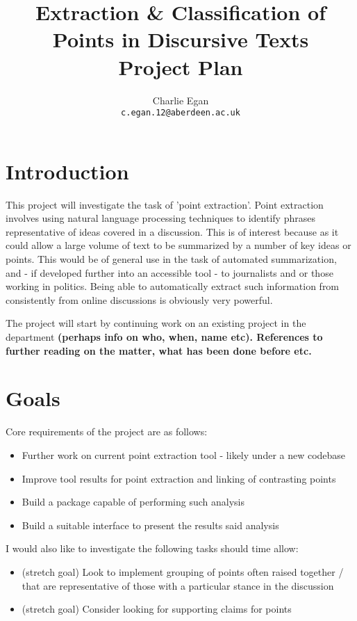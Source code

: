 \documentclass[tikz]{article}
\begin{document}
  \title{Extraction \& Classification of Points in Discursive Texts\\ Project Plan}
  \author{Charlie Egan \\ \texttt{c.egan.12@aberdeen.ac.uk}}

  \maketitle

  \section{Introduction}
    This project will investigate the task of 'point extraction'. Point extraction involves using natural language processing techniques to identify phrases representative of ideas covered in a discussion. This is of interest because as it could allow a large volume of text to be summarized by a number of key ideas or points. This would be of general use in the task of automated summarization, and - if developed further into an accessible tool - to journalists and or those working in politics. Being able to automatically extract such information from consistently from online discussions is obviously very powerful.

    The project will start by continuing work on an existing project in the department \textbf{(perhaps info on who, when, name etc). References to further reading on the matter, what has been done before etc.}

  \section{Goals}
    Core requirements of the project are as follows:
    \begin{itemize}
      \item{Further work on current point extraction tool - likely under a new codebase}
      \item{Improve tool results for point extraction and linking of contrasting points}
      \item{Build a package capable of performing such analysis}
      \item{Build a suitable interface to present the results said analysis}
    \end{itemize}
    I would also like to investigate the following tasks should time allow:
    \begin{itemize}
      \item{(stretch goal) Look to implement grouping of points often raised together / that are representative of those with a particular stance in the discussion}
      \item{(stretch goal) Consider looking for supporting claims for points}
    \end{itemize}
\end{document}
